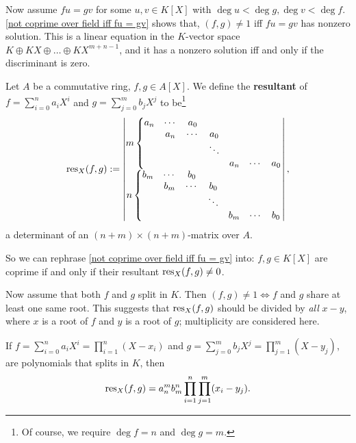 Now assume $fu = gv$ for some $u, v\in K[X]$ with $\deg u  < \deg g, \deg v < \deg f$.
\cref{not coprime over field iff fu = gv} shows that, $(f, g)\ne 1$ iff $fu = gv$ has nonzero solution. This is a linear equation in the $K$-vector space $K\oplus KX\oplus\dots\oplus KX^{m+n-1}$, and it has a nonzero solution iff and only if the discriminant is zero.
\begin{definition}
    Let $A$ be a commutative ring, $f, g\in A[X]$.
    We define the \textbf{resultant} of $f = \sum_{i=0}^{n}a_iX^i$ and $g = \sum_{j = 0}^m b_jX^j$ to be\footnote{Of course, we require $\deg f = n$ and $\deg g = m$.} \[\operatorname{res}_X(f, g) := 
\begin{vmatrix}
    m\left\{\begin{matrix}
        a_n & \cdots & a_0 &  &  &  & \\
         & a_n & \cdots &a_0 &  &  & \\ 
         & & & \ddots & & & \\ 
         & &  &  & a_n & \cdots & a_0
    \end{matrix}\right.\\
    n\left\{\begin{matrix}
        b_m & \cdots & b_0 &  &  &  & \\
         & b_m & \cdots &b_0 &  &  & \\ 
         & & & \ddots & & & \\ 
         & &  &  & b_m & \cdots & b_0
    \end{matrix}\right.
\end{vmatrix},\]
    a determinant of an $(n + m)\times (n + m)$-matrix over $A$.
\end{definition}
So we can rephrase \cref{not coprime over field iff fu = gv} into:
$f, g\in K[X]$ are coprime if and only if their resultant $\operatorname{res}_X(f, g) \ne 0$.

Now assume that both $f$ and $g$ split in $K$.
Then $(f, g)\ne 1\iff f$ and $g$ share at least one same root. This suggests that $\operatorname{res}_X(f, g)$ should be divided by \textit{all} $x - y$, where $x$ is a root of $f$ and $y$ is a root of $g$; multiplicity are considered here.
\begin{theorem}\label{resultant and roots}
    If $f = \sum_{i=0}^{n}a_iX^i = \prod_{i=1}^n(X-x_i)$ and $g = \sum_{j = 0}^m b_jX^j = \prod_{j = 1}^m (X - y_j)$,
    are polynomials that splits in $K$,
    then \[\operatorname{res}_X(f, g) = a_n^mb_m^n\prod_{i=1}^n\prod_{j=1}^m (x_i - y_j).\]
\end{theorem}

